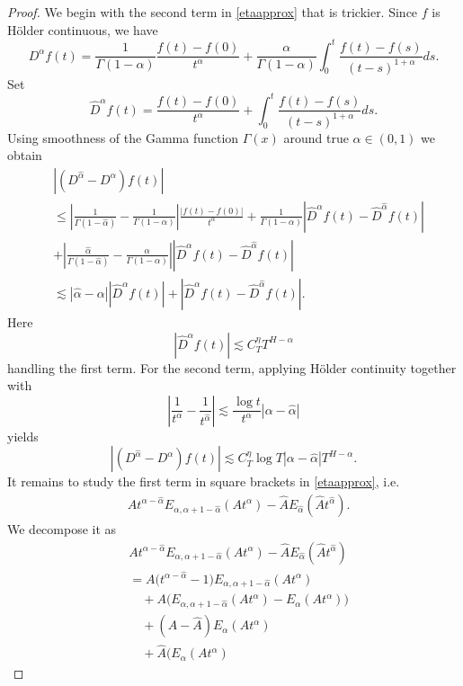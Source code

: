 \documentclass[10pt,a4paper]{amsart}
\begin{document}
\begin{proof}
We begin with the second term in \eqref{etaapprox} that is trickier. Since $f$ is H\"older continuous, we have 
\begin{equation*}
D^\alpha f(t) = \frac{1}{\Gamma(1-\alpha)}\frac{f(t)-f(0)}{t^\alpha} + \frac{\alpha}{\Gamma(1-\alpha)}\int_0^t \frac{f(t)-f(s)}{(t-s)^{1+\alpha}}ds.
\end{equation*}
Set 
$$
\hat{D}^\alpha f(t) = \frac{f(t)-f(0)}{t^\alpha} + \int_0^t \frac{f(t)-f(s)}{(t-s)^{1+\alpha}}ds.
$$
Using smoothness of the Gamma function $\Gamma(x)$ around true $\alpha \in (0,1)$ we obtain 
\begin{align*}
& |(D^{\hat\alpha} - D^\alpha)f(t)| \\
&\leq  \left|\frac{1}{\Gamma(1-\hat\alpha)} - \frac{1}{\Gamma(1-\alpha)}\right|\frac{|f(t)-f(0)|}{t^\alpha} + \frac{1}{\Gamma(1-\alpha)}|\hat{D}^\alpha f(t) - \hat{D}^{\hat\alpha} f(t)|\\
&+  \left|\frac{\hat\alpha}{\Gamma(1-\hat\alpha)} - \frac{\alpha}{\Gamma(1-\alpha)}\right||\hat{D}^\alpha f(t) - \hat{D}^{\hat\alpha} f(t)|\\
&\lesssim |\hat\alpha - \alpha||\hat{D}^\alpha f(t)| + |\hat{D}^\alpha f(t) - \hat{D}^{\hat\alpha} f(t)|.
\end{align*}
Here 
$$
|\hat{D}^\alpha f(t)| \lesssim C^\eta_T T^{H-\alpha}
$$
handling the first term. For the second term, applying H\"older continuity together with 
$$
\left\vert\frac{1}{t^{\alpha}} - \frac{1}{t^{\hat\alpha}}\right\vert \lesssim \frac{\log t}{t^\alpha} |\alpha - \hat\alpha|
$$
yields
$$
|(D^{\hat\alpha} - D^\alpha)f(t)| \lesssim C_T^\eta \log T |\alpha-\hat\alpha| T^{H-\alpha}.
$$
It remains to study the first term in square brackets in \eqref{etaapprox}, i.e.
\begin{align*}
& At^{\alpha-\hat\alpha}E_{\alpha,\alpha+1-\hat\alpha}(A t^\alpha) - \hat{A}E_{\hat\alpha}(\hat{A}t^{\hat\alpha}).
\end{align*}
We decompose it as
\begin{align*}
	&
	A t^{\alpha-\hat\alpha}
	E_{\alpha,\alpha+1-\hat\alpha}(At^\alpha)
	-
	\hat A
	E_{\hat\alpha}( \hat A t^{\hat\alpha} )
	\\
	&=
	A\Big(
	t^{\alpha-\hat\alpha}-1
	\Big)
	E_{\alpha,\alpha+1-\hat\alpha}(At^\alpha)
	\\
	&\quad
	+
	A\Big(
	E_{\alpha,\alpha+1-\hat\alpha}(At^\alpha)
	-
	E_\alpha(At^\alpha)
	\Big)
	\\
	&\quad
	+
	(A-\hat A)E_\alpha(At^\alpha)
	\\
	&\quad
	+
	\hat A
	\Big(
	E_\alpha(At^\alpha)

\end{align*}
\end{proof}
\end{document}
